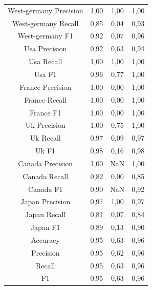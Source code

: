 \documentclass{classrep}
\begin{document}
\begin{table}[h!]
\begin{tabular}{c c c c}
\hline
West-germany Precision 		& 1,00 & 1,00 & 1,00 \\
West-germany Recall 		& 0,85 & 0,04 & 0,93 \\
West-germany F1			& 0,92 & 0,07 & 0,96 \\
\hline
Usa Precision 			& 0,92 & 0,63 & 0,94 \\
Usa Recall				& 1,00 & 1,00 & 1,00 \\
Usa F1			 	& 0,96 & 0,77 & 1,00 \\
\hline
France Precision 			& 1,00 & 0,00 & 1,00 \\
France Recall 			& 1,00 & 0,00 & 1,00 \\
France F1 				& 1,00 & 0,00 & 1,00 \\
\hline
Uk Precision 				& 1,00 & 0,75 & 1,00 \\
Uk Recall 				& 0,97 & 0,09 & 0,97 \\
Uk F1 					& 0,98 & 0,16 & 0,98 \\
\hline
Canada Precision			& 1,00 & NaN & 1,00\\
Canada Recall 			& 0,82 & 0,00 & 0,85 \\
Canada F1 				& 0,90 & NaN & 0,92\\
\hline
Japan Precision 			& 0,97 & 1,00 & 0,97 \\
Japan Recall 				& 0,81 & 0,07 & 0,84 \\
Japan F1 				& 0,89 & 0,13 & 0,90 \\
\hline
Accuracy 				& 0,95 & 0,63 & 0,96 \\
Precision 				& 0,95 & 0,62 & 0,96 \\
Recall 					& 0,95 & 0,63 & 0,96 \\	
F1 					& 0,95 & 0,63 & 0,96 \\

\end {tabular}
\label {t5}
\end{table}

\newpage
\end{document}

